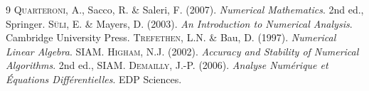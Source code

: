 \documentclass[12pt,a4paper,twoside]{book}
\theoremstyle{definition}
\theoremstyle{plain}
\theoremstyle{remark}
\begin{document}
\begin{thebibliography}{9}
 \textsc{Quarteroni}, A., Sacco, R. \& Saleri, F. (2007). \emph{Numerical Mathematics}. 2nd ed., Springer.
 \textsc{S\"uli}, E. \& Mayers, D. (2003). \emph{An Introduction to Numerical Analysis}. Cambridge University Press.
 \textsc{Trefethen}, L.N. \& Bau, D. (1997). \emph{Numerical Linear Algebra}. SIAM.
 \textsc{Higham}, N.J. (2002). \emph{Accuracy and Stability of Numerical Algorithms}. 2nd ed., SIAM.
 \textsc{Demailly}, J.-P. (2006). \emph{Analyse Num\'erique et \'Equations Diff\'erentielles}. EDP Sciences.
\end{thebibliography}

\printindex
\end{document}
